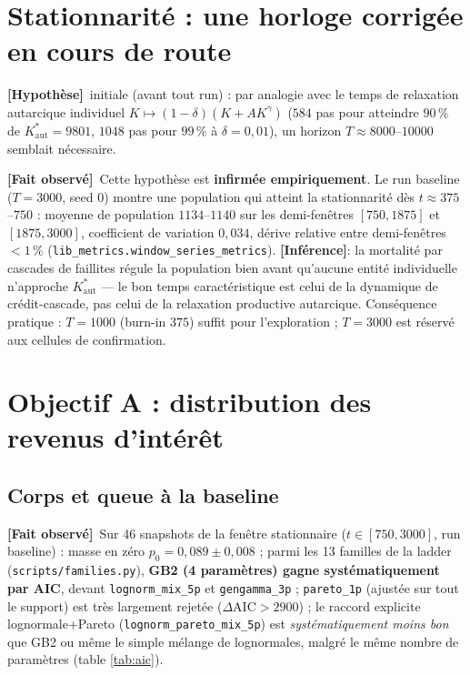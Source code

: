 \documentclass[11pt,a4paper]{article}
\newcommand{\code}[1]{\texttt{#1}}
\newcommand{\Kaut}{K^{*}_{\mathrm{aut}}}
\newcommand{\fait}{\textbf{[Fait observé]}}
\newcommand{\inference}{\textbf{[Inférence]}}
\newcommand{\hyp}{\textbf{[Hypothèse]}}
\begin{document}
\section{Stationnarité : une horloge corrigée en cours de route}

\hyp\ initiale (avant tout run) : par analogie avec le temps de relaxation
autarcique individuel $K\mapsto(1-\delta)(K+AK^\gamma)$
($584$ pas pour atteindre $90\,\%$ de $\Kaut=9801$, $1048$ pas pour
$99\,\%$ à $\delta=0{,}01$), un horizon $T\approx8000$--$10000$ semblait
nécessaire.

\fait\ Cette hypothèse est \textbf{infirmée empiriquement}. Le run baseline
($T=3000$, seed 0) montre une population qui atteint la stationnarité dès
$t\approx375$--$750$ : moyenne de population $1134$--$1140$ sur les
demi-fenêtres $[750,1875]$ et $[1875,3000]$, coefficient de variation
$0{,}034$, dérive relative entre demi-fenêtres $<1\,\%$
(\code{lib\_metrics.window\_series\_metrics}). \inference : la mortalité
par cascades de faillites régule la population bien avant qu'aucune entité
individuelle n'approche $\Kaut$ --- le bon temps caractéristique est celui
de la dynamique de crédit-cascade, pas celui de la relaxation productive
autarcique. Conséquence pratique : $T=1000$ (burn-in $375$) suffit pour
l'exploration ; $T=3000$ est réservé aux cellules de confirmation.

\section{Objectif A : distribution des revenus d'intérêt}

\subsection{Corps et queue à la baseline}

\fait\ Sur 46 snapshots de la fenêtre stationnaire ($t\in[750,3000]$,
run baseline) : masse en zéro $p_0=0{,}089\pm0{,}008$ ; parmi les 13
familles de la ladder (\code{scripts/families.py}), \textbf{GB2 (4
paramètres) gagne systématiquement par AIC}, devant \code{lognorm\_mix\_5p}
et \code{gengamma\_3p} ; \code{pareto\_1p} (ajustée sur tout le support)
est très largement rejetée ($\Delta\mathrm{AIC}>2900$) ; le raccord
explicite lognormale+Pareto (\code{lognorm\_pareto\_mix\_5p}) est
\emph{systématiquement moins bon} que GB2 ou même le simple mélange de
lognormales, malgré le même nombre de paramètres (table
\ref{tab:aic}).
\end{document}
